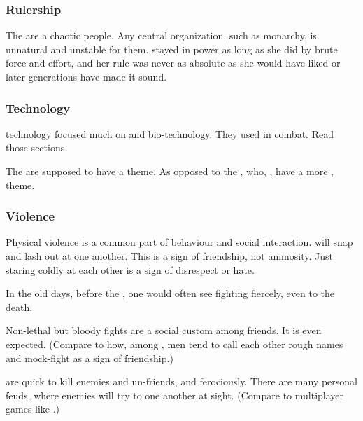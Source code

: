 \subsubsection{Rulership}
The \dragons{} are a chaotic people. 
Any central organization, such as monarchy, is unnatural and unstable for them. 
 stayed in power as long as she did by brute force and effort, and her rule was never as absolute as she would have liked or later generations have made it sound. 





\subsubsection{Technology}
\Draconic technology focused much on  and bio-technology. 
They used  in combat. 
Read those sections. 

The \dragons are supposed to have a  theme.
As opposed to the \resphain, who, , have a more ,  theme. 





\subsubsection{Violence}
Physical violence is a common part of \Draconic{} behaviour and social interaction. 
\Dragons{} will snap and lash out at one another. 
This is a sign of friendship, not animosity. 
Just staring coldly at each other is a sign of disrespect or hate. 

In the old days, before the \secondbanewar, one would often see \dragons{} fighting fiercely, even to the death. 

Non-lethal but bloody fights are a social custom among friends.
It is even expected. 
(Compare to how, among \humans, men tend to call each other rough names and mock-fight as a sign of friendship.)

\Dragons{} are quick to kill enemies and un-friends, and ferociously. 
There are many personal feuds, where enemies will try to  one another at sight. 
(Compare to multiplayer games like \cite{VideoGame:WorldofWarcraft}.)















